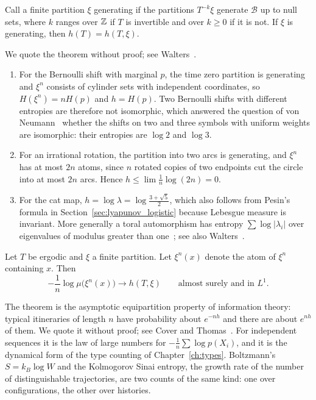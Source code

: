 \begin{theorem}
\label{thm:kolmogorov_sinai}
Call a finite partition $\xi$ generating if the partitions $T^{-k}\xi$ generate $\mathcal{B}$ up to null sets, where $k$ ranges over $\mathbb{Z}$ if $T$ is invertible and over $k\geq0$ if it is not. If $\xi$ is generating, then $h(T) = h(T,\xi)$.
\end{theorem}

We quote the theorem without proof; see Walters~\cite[Chapter~4]{walters1982}.

\begin{example}
\begin{enumerate}
\item For the Bernoulli shift with marginal $p$, the time zero partition is generating and $\xi^n$ consists of cylinder sets with independent coordinates, so $H(\xi^n) = nH(p)$ and $h = H(p)$. Two Bernoulli shifts with different entropies are therefore not isomorphic, which answered the question of von Neumann~\cite{vonneumann1932operator} whether the shifts on two and three symbols with uniform weights are isomorphic: their entropies are $\log2$ and $\log3$.
\item For an irrational rotation, the partition into two arcs is generating, and $\xi^n$ has at most $2n$ atoms, since $n$ rotated copies of two endpoints cut the circle into at most $2n$ arcs. Hence $h\leq\lim\frac1n\log(2n) = 0$.
\item For the cat map, $h = \log\lambda = \log\frac{3+\sqrt5}{2}$, which also follows from Pesin's formula in Section~\ref{sec:lyapunov_logistic} because Lebesgue measure is invariant. More generally a toral automorphism has entropy $\sum\log|\lambda_i|$ over eigenvalues of modulus greater than one~\cite{yuzvinskii1967}; see also Walters~\cite{walters1982}.
\end{enumerate}
\end{example}

\begin{theorem}
\label{thm:shannon_mcmillan_breiman}
Let $T$ be ergodic and $\xi$ a finite partition. Let $\xi^n(x)$ denote the atom of $\xi^n$ containing $x$. Then
\[
-\frac1n\log\mu\big(\xi^n(x)\big)\longrightarrow h(T,\xi)\qquad\text{almost surely and in }L^1.
\]
\end{theorem}

The theorem is the asymptotic equipartition property of information theory: typical itineraries of length $n$ have probability about $e^{-nh}$ and there are about $e^{nh}$ of them. We quote it without proof; see Cover and Thomas~\cite[Chapter~16]{covertomas}. For independent sequences it is the law of large numbers for $-\frac1n\sum\log p(X_i)$, and it is the dynamical form of the type counting of Chapter~\ref{ch:types}. Boltzmann's $S = k_B\log W$ and the Kolmogorov Sinai entropy, the growth rate of the number of distinguishable trajectories, are two counts of the same kind: one over configurations, the other over histories.

